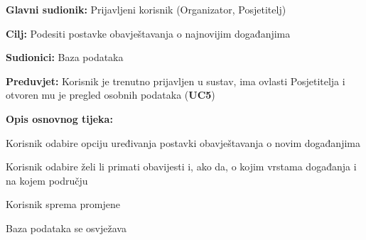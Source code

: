 
\noindent {}
\begin{packed_item}
	
	\item \textbf{Glavni sudionik:} Prijavljeni korisnik (Organizator, Posjetitelj)
	\item  \textbf{Cilj:} Podesiti postavke obavještavanja o najnovijim događanjima
	\item  \textbf{Sudionici:} Baza podataka
	\item  \textbf{Preduvjet:} Korisnik je trenutno prijavljen u sustav, ima ovlasti Posjetitelja i otvoren mu je pregled osobnih podataka (\textbf{UC5})
	\item  \textbf{Opis osnovnog tijeka:}
	
	\item[] \begin{packed_enum}
		
		\item Korisnik odabire opciju uređivanja postavki obavještavanja o novim događanjima
		\item Korisnik odabire želi li primati obavijesti i, ako da, o kojim vrstama događanja i na kojem području
		\item Korisnik sprema promjene
		\item Baza podataka se osvježava
		
	\end{packed_enum}
	
	
		
			
			
		
	\end{packed_item}
	
